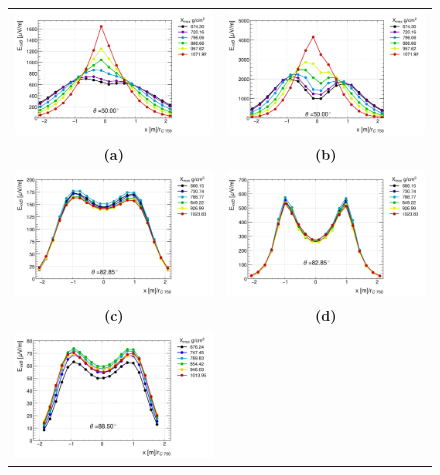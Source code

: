 \begin{figure}[h!]
\centering
\begin{tabular}{cc}
    \includegraphics[width=0.45\linewidth]{50zenLDF.png} &
    \includegraphics[width=0.45\linewidth]{50zenLDF200.png} \\
    \textbf{(a)} & \textbf{(b)} \\
    \includegraphics[width=0.45\linewidth]{82zenLDF.png} &
    \includegraphics[width=0.45\linewidth]{82zenLDF200.png} \\
    \textbf{(c)} & \textbf{(d)} \\
    \includegraphics[width=0.45\linewidth]{88zenLDF.png} &

\end{tabular}
\end{figure}
